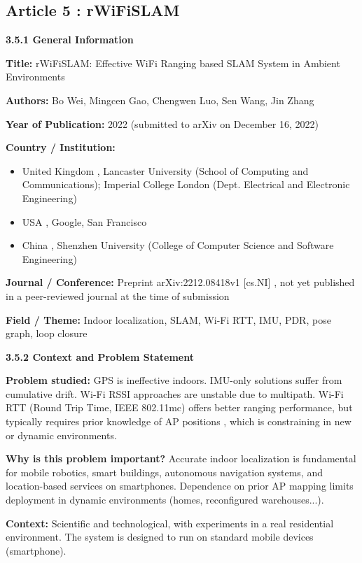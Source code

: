 \documentclass{ipgpmaster}
\begin{document}
\subsection{Article 5 : rWiFiSLAM}

\textbf{3.5.1 General Information}

\textbf{Title:} rWiFiSLAM: Effective WiFi Ranging based SLAM System in Ambient Environments

\textbf{Authors:} Bo Wei, Mingcen Gao, Chengwen Luo, Sen Wang, Jin Zhang

\textbf{Year of Publication:} 2022 (submitted to arXiv on December 16, 2022)

\textbf{Country / Institution:}

\begin{itemize}
    \item United Kingdom ,  Lancaster University (School of Computing and Communications); Imperial College London (Dept. Electrical and Electronic Engineering)
    \item USA ,  Google, San Francisco
    \item China ,  Shenzhen University (College of Computer Science and Software Engineering)
\end{itemize}
\textbf{Journal / Conference:} Preprint arXiv:2212.08418v1 [cs.NI] ,  not yet published in a peer-reviewed journal at the time of submission

\textbf{Field / Theme:} Indoor localization, SLAM, Wi-Fi RTT, IMU, PDR, pose graph, loop closure

 \textbf{3.5.2 Context and Problem Statement}

\textbf{Problem studied:} GPS is ineffective indoors. IMU-only solutions suffer from cumulative drift. Wi-Fi RSSI approaches are unstable due to multipath. Wi-Fi RTT (Round Trip Time, IEEE 802.11mc) offers better ranging performance, but typically requires prior knowledge of AP positions ,  which is constraining in new or dynamic environments.

\textbf{Why is this problem important?} Accurate indoor localization is fundamental for mobile robotics, smart buildings, autonomous navigation systems, and location-based services on smartphones. Dependence on prior AP mapping limits deployment in dynamic environments (homes, reconfigured warehouses...).

\textbf{Context:} Scientific and technological, with experiments in a real residential environment. The system is designed to run on standard mobile devices (smartphone).
\end{document}
